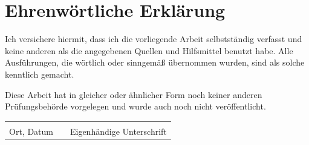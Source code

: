 
\section*{Ehrenwörtliche Erklärung}

Ich versichere hiermit, dass ich die vorliegende Arbeit selbstständig verfasst und keine anderen als die angegebenen Quellen und Hilfsmittel benutzt habe. Alle Ausführungen, die wörtlich oder sinngemäß übernommen wurden, sind als solche kenntlich gemacht.

Diese Arbeit hat in gleicher oder ähnlicher Form noch keiner anderen Prüfungsbehörde vorgelegen und wurde auch noch nicht veröffentlicht.

\vspace{2.5cm}

\noindent
\begin{tabular}{@{}p{6.5cm}p{1.5cm}p{6.5cm}@{}}
\dotfill & & \dotfill \\
Ort, Datum & & Eigenhändige Unterschrift \\
\end{tabular}
